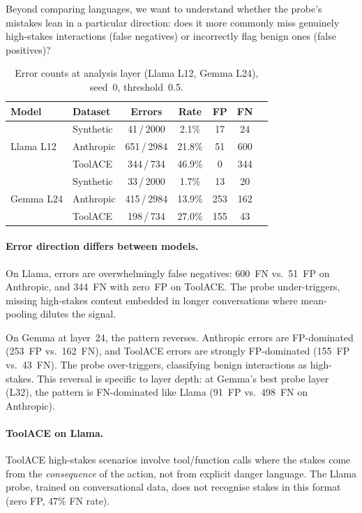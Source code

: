 \documentclass{article}
\begin{document}
Beyond comparing languages, we want to understand whether the probe's mistakes
lean in a particular direction: does it more commonly miss genuinely
high-stakes interactions (false negatives) or incorrectly flag benign ones
(false positives)?
\begin{table}[t]
\centering
\caption{Error counts at analysis layer (Llama L12, Gemma L24), seed~0, threshold~0.5.}
\label{tab:errors}
\begin{tabular}{llccccc}
\toprule
Model        & Dataset   & Errors      & Rate   & FP & FN \\
\midrule
\multirow{3}{*}{Llama L12}
 & Synthetic  & 41\,/\,2000 &  2.1\% & 17 & 24 \\
 & Anthropic  & 651\,/\,2984 & 21.8\% & 51 & 600 \\
 & ToolACE    & 344\,/\,734 & 46.9\% &  0 & 344 \\
\midrule
\multirow{3}{*}{Gemma L24}
 & Synthetic  & 33\,/\,2000 &  1.7\% & 13 & 20 \\
 & Anthropic  & 415\,/\,2984 & 13.9\% & 253 & 162 \\
 & ToolACE    & 198\,/\,734 & 27.0\% & 155 & 43 \\
\bottomrule
\end{tabular}
\end{table}
\paragraph{Error direction differs between models.}
On Llama, errors are overwhelmingly false negatives: 600~FN vs.\ 51~FP on
Anthropic, and 344~FN with zero~FP on ToolACE.
The probe under-triggers, missing high-stakes content embedded in longer
conversations where mean-pooling dilutes the signal.

On Gemma at layer~24, the pattern reverses.
Anthropic errors are FP-dominated (253~FP vs.\ 162~FN), and ToolACE errors
are strongly FP-dominated (155~FP vs.\ 43~FN).
The probe over-triggers, classifying benign interactions as high-stakes.
This reversal is specific to layer depth: at Gemma's best probe layer (L32),
the pattern is FN-dominated like Llama (91~FP vs.\ 498~FN on Anthropic).

\paragraph{ToolACE on Llama.}
ToolACE high-stakes scenarios involve tool/function calls where the stakes come
from the \emph{consequence} of the action, not from explicit danger language.
The Llama probe, trained on conversational data, does not recognise stakes in
this format (zero FP, 47\% FN rate).
\end{document}
